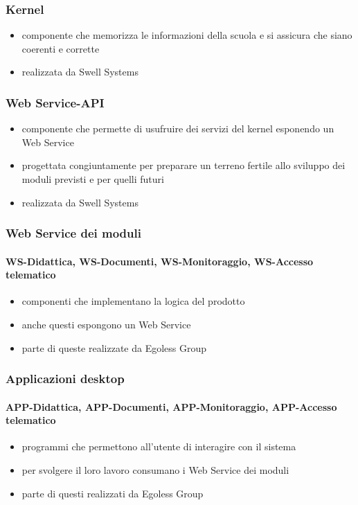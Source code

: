 \begin{frame}
  \frametitle{Kernel}
  
 \begin{itemize}
\item componente che memorizza le informazioni della scuola e si assicura che siano coerenti e corrette
\item realizzata da Swell Systems
\end{itemize}

\end{frame}

\begin{frame}
\frametitle{Web Service-API}

\begin{itemize}
\item componente che permette di usufruire dei servizi del kernel esponendo un Web Service
\item progettata congiuntamente per preparare un terreno fertile allo sviluppo dei moduli previsti e per quelli futuri
\item realizzata da Swell Systems
\end{itemize}

\end{frame}

\begin{frame}
\frametitle{Web Service dei moduli}
\framesubtitle{WS-Didattica, WS-Documenti, WS-Monitoraggio, WS-Accesso telematico}

\begin{itemize}
\item componenti che implementano la logica del prodotto
\item anche questi espongono un Web Service
\item parte di queste realizzate da Egoless Group
\end{itemize}

\end{frame}

\begin{frame}
\frametitle{Applicazioni desktop}
\framesubtitle{APP-Didattica, APP-Documenti, APP-Monitoraggio, APP-Accesso telematico}

\begin{itemize}
\item programmi che permettono all'utente di interagire con il sistema
\item per svolgere il loro lavoro consumano i Web Service dei moduli
\item parte di questi realizzati da Egoless Group
\end{itemize}

\end{frame}

